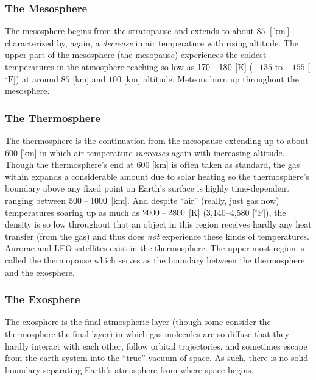 \documentclass[11pt,dvipsnames]{thesis}
\begin{document}
\subsubsection{The Mesosphere}
The mesosphere begins from the stratopause and extends to about $85$ $[\si{\km}]$ characterized by, again, a \textit{decrease} in air temperature with rising altitude. The upper part of the mesosphere (the mesopause) experiences the coldest temperatures in the atmosphere reaching so low as $170\hspace{0.5ex}$--$\hspace{0.5ex}180$ [\si{\K}] ($-135$ to $-155$ [$^\circ\mathrm{F}$]) at around $85$ [\si{\km}] and $100$ [\si{\km}] altitude. Meteors burn up throughout the mesosphere.

\subsubsection{The Thermosphere}
The thermosphere is the continuation from the mesopause extending up to about $600$ [\si{\km}] in which air temperature \textit{increases} again with increasing altitude. Though the thermosphere's end at $600$ [\si{\km}] is often taken as standard, the gas within expands a considerable amount due to solar heating so the thermosphere's boundary above any fixed point on Earth's surface is highly time-dependent ranging between $500\hspace{0.5ex}$--$\hspace{0.5ex}1000$ [\si{\km}].
And despite ``air'' (really, just gas now) temperatures soaring up as much as $2000\hspace{0.5ex}$--$\hspace{0.5ex}2800$ [\si{\K}] (3,140\hspace{0.5ex}--\hspace{0.5ex}4,580 [$^\circ\mathrm{F}$]), the density is so low throughout that an object in this region receives hardly any heat transfer (from the gas) and thus does \textit{not} experience these kinds of temperatures.
Aurorae and LEO satellites exist in the thermosphere. The upper-most region is called the thermopause which serves as the boundary between the thermosphere and the exosphere.

\subsubsection{The Exosphere}
The exosphere is the final atmospheric layer (though some consider the thermosphere the final layer) in which gas molecules are so diffuse that they hardly interact with each other, follow orbital trajectories, and sometimes escape from the earth system into the ``true'' vacuum of space. As such, there is no solid boundary separating Earth's atmosphere from where space begins.
\end{document}

